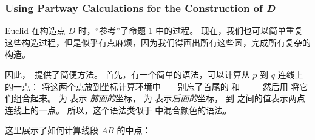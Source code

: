 \subsubsection{Using Partway Calculations for the Construction of \emph{D}}

\bohs

Euclid 在构造点 $D$ 时，“参考”了命题 1 中的过程。
现在，我们也可以简单重复这些构造过程，但是似乎有点麻烦，因为我们得画出所有这些圆，完成所有复杂的构造。

因此，\tikzname\ 提供了简便方法。
首先，有一个简单的语法，可以计算从 $p$ 到 $q$ 连线上的一点：
将这两个点放到坐标计算环境中——别忘了首尾的 \ltz{($} 和 \ltz{$)}——
然后用 \ltz{!}\ltz{!} 将它们组合起来。
 为  表示 \emph{前面的}坐标， 为  表示\emph{后面的}坐标， 到  之间的值表示两点连线上的一点。
所以，这个语法类似于  中混合颜色的语法。

这里展示了如何计算线段 $AB$ 的中点：

\eohs

\begin{codeexample}[]
\end{codeexample}

